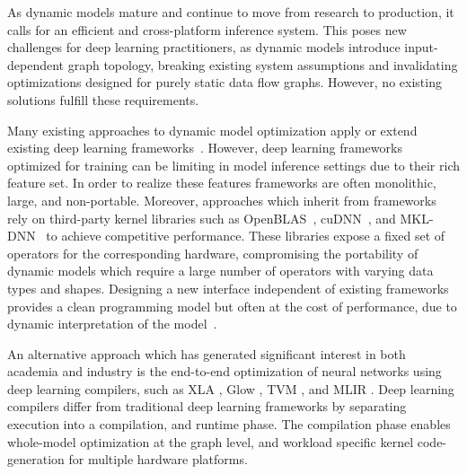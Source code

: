 As dynamic models mature and continue to move from research to production, it calls for an efficient and cross-platform inference system.
This poses new challenges for deep learning practitioners, as dynamic models introduce input-dependent graph topology, breaking existing system assumptions and invalidating optimizations designed for purely static data flow graphs.
However, no existing solutions fulfill these requirements.

Many existing approaches to dynamic model optimization apply or extend existing deep learning frameworks~\citep{xu2018cavs, gao2018low, yu2018dynamic, jeong2018improving, jeong2019janus, dynet, tf_fold}.
However, deep learning frameworks optimized for training can be limiting in model inference settings due to their rich feature set. In order to realize these features frameworks are often monolithic, large, and non-portable.
Moreover, approaches which inherit from frameworks rely on third-party kernel libraries such as OpenBLAS~\citep{xianyi2014openblas}, cuDNN~\citep{cudnn}, and MKL-DNN~\citep{mkldnn} to achieve competitive performance. These libraries expose a fixed set of operators for the corresponding hardware, compromising the portability of dynamic models which require a large number of operators with varying data types and shapes. Designing a new interface independent of existing frameworks provides a clean programming model but often at the cost of performance, due to dynamic interpretation of the model~\citep{dynet}.

An alternative approach which has generated significant interest in both academia and industry is the end-to-end optimization of neural networks using deep learning compilers, such as XLA \citep{xla}, Glow \citep{glow}, TVM \citep{tvm_osdi18}, and MLIR \citep{lattner2020mlir}.
Deep learning compilers differ from traditional deep learning frameworks by separating execution into a compilation, and runtime phase. The compilation phase enables whole-model optimization at the graph level, and workload specific kernel code-generation for multiple hardware platforms.

